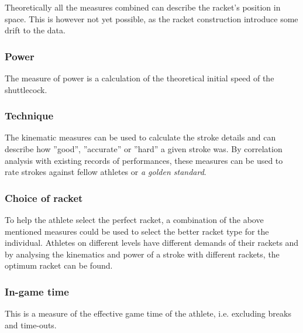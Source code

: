 Theoretically all the measures combined can describe the racket's position in space.
This is however not yet possible, as the racket construction introduce some drift to the data.

\subsubsection*{Power}
The measure of power is a calculation of the theoretical initial speed of the shuttlecock.

\subsubsection*{Technique}
The kinematic measures can be used to calculate the stroke details and can describe how ''good'', ''accurate'' or ''hard'' a given stroke was.
By correlation analysis with existing records of performances, these measures can be used to rate strokes against fellow athletes or \textit{a golden standard}.

\subsubsection*{Choice of racket}
To help the athlete select the perfect racket, a combination of the above mentioned measures could be used to select the better racket type for the individual.
Athletes on different levels have different demands of their rackets and by analysing the kinematics and power of a stroke with different rackets, the optimum racket can be found.

\subsubsection*{In-game time}
This is a measure of the effective game time of the athlete, i.e. excluding breaks and time-outs.
